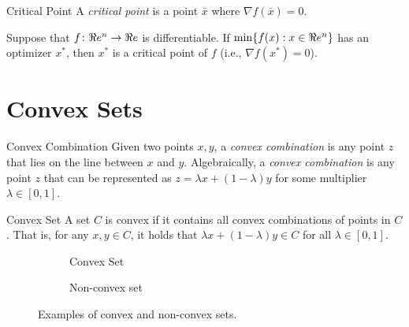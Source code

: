 \begin{definition}{Critical Point}{}
A \emph{critical point} is a point $\bar x$ where $\nabla f(\bar x) = 0$.
\end{definition}

\begin{theorem}{}{}
Suppose that $f\colon \Re e^n \to \Re e$ is differentiable.  If $\min\{ f(x) : x \in \Re e^n\}$ has an optimizer $x^*$, then $x^*$ is a critical point of $f$ (i.e., $\nabla f(x^*) = 0$).
\end{theorem}




\section{Convex Sets}

\begin{definition}{Convex Combination}{}
Given two points $x,y$, a \emph{convex combination} is any point $z$ that lies on the line between $x$ and $y$.  Algebraically, a \emph{convex combination} is any point $z$ that can be represented as $z = \lambda x + (	1-\lambda) y $ for some multiplier $\lambda \in [0,1]$.
\end{definition}

\begin{definition}{Convex Set}{}
A set $C$ is convex if it contains all convex combinations of points in $C$.  That is, for any $x,y \in C$, it holds that $ \lambda x + (1-\lambda) y \in C$ for all $\lambda \in [0,1]$.
\end{definition}
\begin{figure}[h]
  \begin{subfigure}[b]{0.45\textwidth}
    \centering
    \caption{Convex Set}
    \label{a}
  \end{subfigure}
  \begin{subfigure}[b]{0.45\textwidth}
    \centering
    \caption{Non-convex set}
    \label{b}
  \end{subfigure}
\caption{Examples of convex and non-convex sets.}
\label{fig:convexity}
\end{figure}


